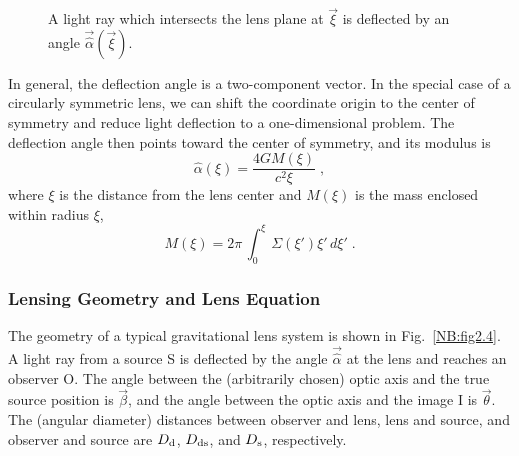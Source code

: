 \documentclass[a4paper,10pt]{article} %
\begin{document}
\begin{figure}[ht] %
\begin{center}
\begin{minipage}[t]{0.6\hsize}
\end{minipage}
\end{center}
\caption{A light ray which intersects the lens plane at $\vec\xi$ is
  deflected by an angle $\vec{\hat\alpha}(\vec\xi)$.}
\label{NB:fig2.3}
\end{figure}

In general, the deflection angle is a two-component vector. In the
special case of a circularly symmetric lens, we can shift the
coordinate origin to the center of symmetry and reduce light
deflection to a one-dimensional problem. The deflection angle then
points toward the center of symmetry, and its modulus is
\begin{equation}
  \hat\alpha(\xi) = \frac{4GM(\xi)}{c^2\xi}\;,
\label{eq:2.12}
\end{equation}
where $\xi$ is the distance from the lens center and $M(\xi)$ is the
mass enclosed within radius $\xi$,
\begin{equation}
  M(\xi) = 2\pi\,\int_0^\xi\,\Sigma(\xi')\xi'\,d\xi'\;.
\label{eq:2.13}
\end{equation}

\subsubsection{Lensing Geometry and Lens Equation}
\label{NB:subsubsect2.1.3}

The geometry of a typical gravitational lens system is shown in Fig.\
\ref{NB:fig2.4}. A light ray from a source S is deflected by the angle
$\vec{\hat\alpha}$ at the lens and reaches an observer O. The angle
between the (arbitrarily chosen) optic axis and the true source
position is $\vec\beta$, and the angle between the optic axis and the
image I is $\vec\theta$. The (angular diameter) distances between
observer and lens, lens and source, and observer and source are
$D_{\rm d}$, $D_{\rm ds}$, and $D_{\rm s}$, respectively.
\end{document}
